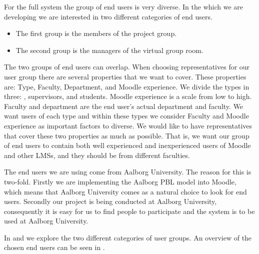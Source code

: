 For the full system the group of end users is very diverse.
In the \subsystem{} which we are developing we are interested in two different categories of end users.
\begin{itemize}
	\item The first group is the members of the project group.
	\item The second group is the managers of the virtual group room.
\end{itemize}
The two groups of end users can overlap. 
When choosing representatives for our user group there are several properties that we want to cover. 
These properties are: Type, Faculty, Department, and Moodle experience.
We divide the types in three: \admpers[c], supervisors, and students.
Moodle experience is a scale from low to high.
Faculty and department are the end user's actual department and faculty. %
We want users of each type and within these types we consider Faculty and Moodle experience as important factors to diverse.
We would like to have representatives that cover these two properties as much as possible.
That is, we want our group of end users to contain both well experienced and inexperienced users of Moodle and other LMSs, and  they should be from different faculties. 


The end users we are using come from Aalborg University.
The reason for this is two-fold.
Firstly we are implementing the Aalborg PBL model into Moodle, which means that Aalborg University comes as a natural choice to look for end users.
Secondly our project is being conducted at Aalborg University, consequently it is easy for us to find people to participate and the system is to be used at Aalborg University.

In  and  we explore the two different categories of user groups. 
An overview of the chosen end users can be seen in .


